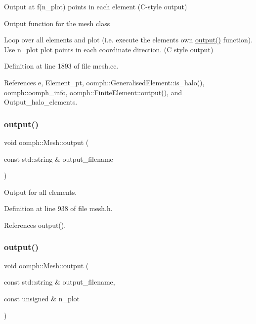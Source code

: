 Output at f(n\+\_\+plot) points in each element (C-\/style output) 

Output function for the mesh class

Loop over all elements and plot (i.\+e. execute the element\textquotesingle{}s own \hyperlink{classoomph_1_1Mesh_aab74388e8e21325f3ca26f1bd99c26f7}{output()} function). Use n\+\_\+plot plot points in each coordinate direction. (C style output) 

Definition at line 1893 of file mesh.\+cc.



References e, Element\+\_\+pt, oomph\+::\+Generalised\+Element\+::is\+\_\+halo(), oomph\+::oomph\+\_\+info, oomph\+::\+Finite\+Element\+::output(), and Output\+\_\+halo\+\_\+elements.

\mbox{\label{classoomph_1_1Mesh_a411332db681ec982e88f60c40b3b648d}} 
\subsubsection{\texorpdfstring{output()}{output()}\hspace{0.1cm}{\footnotesize\ttfamily [5/6]}}
{\footnotesize\ttfamily void oomph\+::\+Mesh\+::output (\begin{DoxyParamCaption}\item[{const std\+::string \&}]{output\+\_\+filename }\end{DoxyParamCaption})\hspace{0.3cm}{\ttfamily [inline]}}



Output for all elements. 



Definition at line 938 of file mesh.\+h.



References output().

\mbox{\label{classoomph_1_1Mesh_ac9f8eb8a56f81fe525a36157bd166ea0}} 
\subsubsection{\texorpdfstring{output()}{output()}\hspace{0.1cm}{\footnotesize\ttfamily [6/6]}}
{\footnotesize\ttfamily void oomph\+::\+Mesh\+::output (\begin{DoxyParamCaption}\item[{const std\+::string \&}]{output\+\_\+filename,  }\item[{const unsigned \&}]{n\+\_\+plot }\end{DoxyParamCaption})\hspace{0.3cm}{\ttfamily [inline]}}



